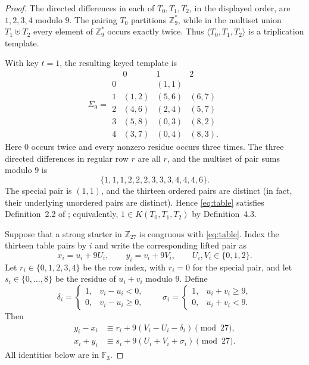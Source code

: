 \documentclass[11pt]{amsart}
\theoremstyle{remark}
\newcommand{\Z}{\mathbb Z}
\newcommand{\F}{\mathbb F}
\begin{document}
\begin{proof}
The directed differences in each of $T_0,T_1,T_2$, in the displayed
order, are $1,2,3,4$ modulo $9$. The pairing $T_0$ partitions
$\Z_9^*$, while in the multiset union $T_1\uplus T_2$ every element of
$\Z_9^*$ occurs exactly twice. Thus
$\langle T_0,T_1,T_2\rangle$ is a triplication template.

With key $t=1$, the resulting keyed template is
\begin{equation}\label{eq:table}
\Sigma_9=
\begin{array}{c|ccc}
 &0&1&2\\ \hline
0&& (1,1)&\\
1&(1,2)&(5,6)&(6,7)\\
2&(4,6)&(2,4)&(5,7)\\
3&(5,8)&(0,3)&(8,2)\\
4&(3,7)&(0,4)&(8,3).
\end{array}
\end{equation}
Here $0$ occurs twice and every nonzero residue occurs three times. The
three directed differences in regular row $r$ are all $r$, and the multiset
of pair sums modulo $9$ is
\[
\{1,1,1,2,2,2,3,3,3,4,4,4,6\}.
\]
The special pair is $(1,1)$, and the thirteen ordered pairs are distinct
(in fact, their underlying unordered pairs are distinct). Hence
\eqref{eq:table} satisfies Definition~2.2 of \cite{OSK}; equivalently,
$1\in K(T_0,T_1,T_2)$ by Definition~4.3.

Suppose that a strong starter in $\Z_{27}$ is congruous with
\eqref{eq:table}. Index the thirteen table pairs by $i$ and write the
corresponding lifted pair as
\[
 x_i=u_i+9U_i,\qquad y_i=v_i+9V_i,
 \qquad U_i,V_i\in\{0,1,2\}.
\]
Let $r_i\in\{0,1,2,3,4\}$ be the row index, with $r_i=0$ for the special
pair, and let $s_i\in\{0,\ldots,8\}$ be the residue of $u_i+v_i$ modulo
$9$. Define
\[
\delta_i=
\begin{cases}
1,&v_i-u_i<0,\\
0,&v_i-u_i\ge0,
\end{cases}
\qquad
\sigma_i=
\begin{cases}
1,&u_i+v_i\ge9,\\
0,&u_i+v_i<9.
\end{cases}
\]
Then
\begin{align}
 y_i-x_i
 &\equiv r_i+9(V_i-U_i-\delta_i)\pmod{27},
 \label{eq:difference}\\
 x_i+y_i
 &\equiv s_i+9(U_i+V_i+\sigma_i)\pmod{27}.
 \label{eq:addition}
\end{align}
All identities below are in $\F_3$.


\end{proof}
\end{document}
